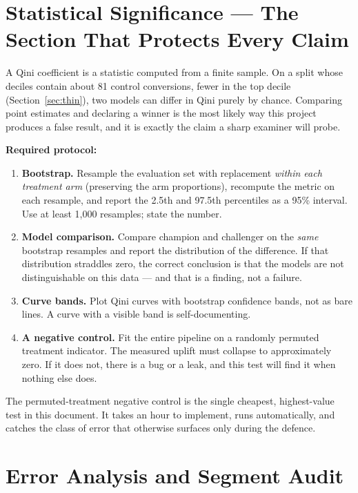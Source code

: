 \documentclass[11pt,a4paper]{article}
\begin{document}
\section{Statistical Significance --- The Section That Protects Every Claim}
\label{sec:significance}

\begin{alertbox}
A Qini coefficient is a statistic computed from a finite sample. On a split whose deciles contain
about 81 control conversions, fewer in the top decile (Section~\ref{sec:thin}), two models can differ in Qini purely by
chance. Comparing point estimates and declaring a winner is the most likely way this project
produces a false result, and it is exactly the claim a sharp examiner will probe.
\end{alertbox}

\textbf{Required protocol:}
\begin{enumerate}
\item \textbf{Bootstrap.} Resample the evaluation set with replacement \emph{within each treatment
arm} (preserving the arm proportions), recompute the metric on each resample, and report the 2.5th
and 97.5th percentiles as a 95\% interval. Use at least 1{,}000 resamples; state the number.
\item \textbf{Model comparison.} Compare champion and challenger on the \emph{same} bootstrap
resamples and report the distribution of the difference. If that distribution straddles zero, the
correct conclusion is that the models are not distinguishable on this data --- and that is a
finding, not a failure.
\item \textbf{Curve bands.} Plot Qini curves with bootstrap confidence bands, not as bare lines.
A curve with a visible band is self-documenting.
\item \textbf{A negative control.} Fit the entire pipeline on a randomly permuted treatment
indicator. The measured uplift must collapse to approximately zero. If it does not, there is a bug
or a leak, and this test will find it when nothing else does.
\end{enumerate}

\begin{goodbox}
The permuted-treatment negative control is the single cheapest, highest-value test in this
document. It takes an hour to implement, runs automatically, and catches the class of error that
otherwise surfaces only during the defence.
\end{goodbox}

\section{Error Analysis and Segment Audit}
\end{document}
